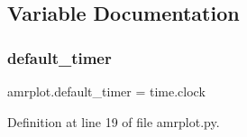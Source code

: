 \subsection{Variable Documentation}
\mbox{\label{namespaceamrplot_a29460b111d807c4745b5a83ec9c4e806}} 
\subsubsection{\texorpdfstring{default\+\_\+timer}{default\_timer}}
{\footnotesize\ttfamily amrplot.\+default\+\_\+timer = time.\+clock}



Definition at line 19 of file amrplot.\+py.

